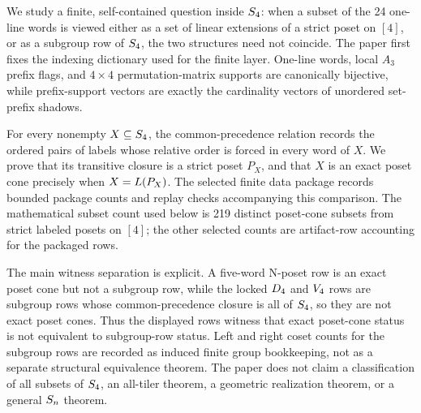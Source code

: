 We study a finite, self-contained question inside \(S_4\): when a subset of the 24 one-line words is viewed either as a set of linear extensions of a strict poset on \([4]\), or as a subgroup row of \(S_4\), the two structures need not coincide. The paper first fixes the indexing dictionary used for the finite layer. One-line words, local \(A_3\) prefix flags, and \(4\times4\) permutation-matrix supports are canonically bijective, while prefix-support vectors are exactly the cardinality vectors of unordered set-prefix shadows.

For every nonempty \(X\subseteq S_4\), the common-precedence relation records the ordered pairs of labels whose relative order is forced in every word of \(X\). We prove that its transitive closure is a strict poset \(P_X\), and that \(X\) is an exact poset cone precisely when \(X=L(P_X)\). The selected finite data package records bounded package counts and replay checks accompanying this comparison. The mathematical subset count used below is 219 distinct poset-cone subsets from strict labeled posets on \([4]\); the other selected counts are artifact-row accounting for the packaged rows.

The main witness separation is explicit. A five-word N-poset row is an exact poset cone but not a subgroup row, while the locked \(D_4\) and \(V_4\) rows are subgroup rows whose common-precedence closure is all of \(S_4\), so they are not exact poset cones. Thus the displayed rows witness that exact poset-cone status is not equivalent to subgroup-row status. Left and right coset counts for the subgroup rows are recorded as induced finite group bookkeeping, not as a separate structural equivalence theorem. The paper does not claim a classification of all subsets of \(S_4\), an all-tiler theorem, a geometric realization theorem, or a general \(S_n\) theorem.